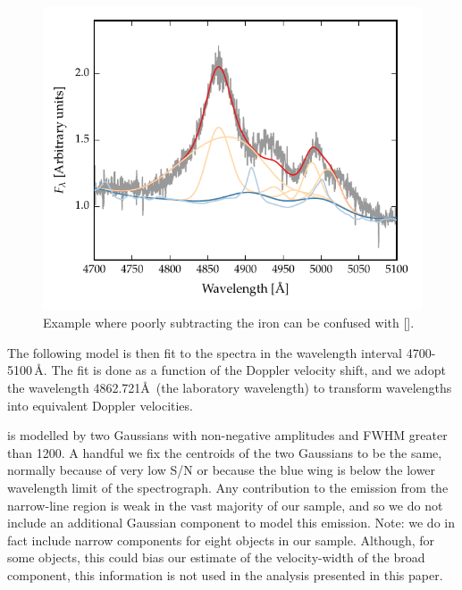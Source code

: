 \begin{figure}
    \centering
    \includegraphics[width=\columnwidth]{figures/chapter04/compare_gaussian_ica_QSO538.pdf} 
    \caption{Example where poorly subtracting the iron can be confused with [].}     
    \label{fig:bad_fe}
\end{figure}







The following model is then fit to the spectra in the wavelength interval 4700-5100\,\AA.
The fit is done as a function of the Doppler velocity shift, and we adopt the wavelength 4862.721\AA\, (the laboratory \hb wavelength) to transform wavelengths into equivalent Doppler velocities.

\hb is modelled by two Gaussians with non-negative amplitudes and FWHM greater than 1200\kms.
A handful we fix the centroids of the two Gaussians to be the same, normally because of very low S/N or because the blue wing is below the lower wavelength limit of the spectrograph. 
Any contribution to the \hb emission from the narrow-line region is weak in the vast majority of our sample, and so we do not include an additional Gaussian component to model this emission. 
Note: we do in fact include narrow components for eight objects in our sample. 
Although, for some objects, this could bias our estimate of the velocity-width of the broad component, this information is not used in the analysis presented in this paper. 

